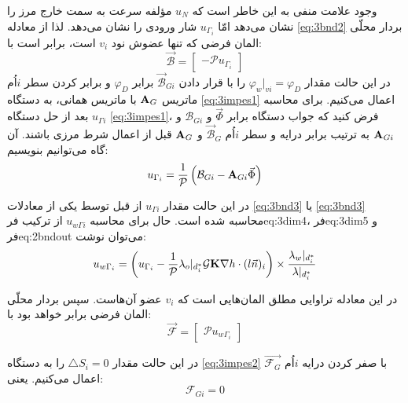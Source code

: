 وجود علامت منفی به این خاطر است که $u_N$ مؤلفه سرعت به سمت خارج مرز را نشان می‌دهد امّا $u_{\Gamma_i}$ شار ورودی را نشان می‌دهد. لذا از معادله  \eqref{eq:3bnd2} بردار محلّی المان فرضی که تنها عضوش نود $v_i$ است، برابر است با:
\begin{equation}
\label{eq:3bnd4}
\vec{\mathcal B} = 
	\begin{bmatrix}
	- \mathcal P u_{\Gamma_i}
	\end{bmatrix}
\end{equation}
در این حالت مقدار
$\varphi_w|_{vi} = \varphi_{D}$
را با قرار دادن  $\vec {\mathcal B}_{Gi}$ برابر $\varphi_D$ و برابر کردن سطر $i$اُم  ماتریس $\textbf A_G$ با ماتریس همانی، به دستگاه  \eqref{eq:3impes1} اعمال می‌کنیم. برای محاسبه $u_{\Gamma i}$ بعد از حل دستگاه  \eqref{eq:3impes1}، فرض کنید که جواب دستگاه برابر $\vec \Phi$ و 
$\mathcal B_{Gi}$ و $\textbf A_{Gi}$
به ترتیب برابر درایه و سطر $i$اُم $\vec {\mathcal B}_{G}$ و $\textbf A_G$ قبل از اعمال شرط مرزی باشند. آن گاه می‌توانیم بنویسیم:
\begin{equation}
\label{eq:3bnd5}
u_{\Gamma_i}= \frac{1}{\mathcal P} \left( \mathcal B_{Gi} - \textbf A_{Gi} \vec \Phi \right)
\end{equation}

در این حالت مقدار $u_{\Gamma i}$ از قبل توسط یکی از معادلات \eqref{eq:3bnd3} یا \eqref{eq:3bnd3} محاسبه شده است. حال برای محاسبه $u_{w\Gamma i}$ از ترکیب  ‌فر{eq:3dim4}، ‌فر{eq:3dim5} و ‌فر{eq:2bndout} می‌توان نوشت:
\begin{equation}
\label{eq:3bnd6}
u_{w\Gamma_i}= \left( u_{\Gamma_i} - 
\frac{1}{\mathcal P}  \lambda_o|_{d^*_i} \mathcal G \textbf K \nabla h \cdot (l\vec n)_i  \right) 
\times \frac{\lambda_w|_{d^*_i}}{\lambda|_{d^*_i}}
\end{equation}

در این معادله  تراوایی مطلق المان‌هایی است که $v_i$ عضو آن‌هاست. سپس بردار محلّی المان فرضی برابر خواهد بود با:
\begin{equation}
\label{eq:3bnd7}
\vec{\mathcal F} = 
	\begin{bmatrix}
	\mathcal P u_{w\Gamma_i}
	\end{bmatrix}
\end{equation}

در این حالت مقدار $\triangle S_i = 0$ را به دستگاه \eqref{eq:3impes2} با صفر کردن درایه $i$اُم $\vec {\mathcal F_{G}}$  اعمال می‌کنیم. یعنی:
\begin{equation}
\label{eq:3bnd8}
\mathcal F_{Gi} = 0
\end{equation} 

